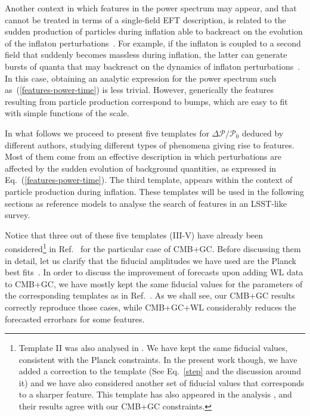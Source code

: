 \documentclass[12pt]{article}
\begin{document}
Another context in which features in the power spectrum may appear, and that cannot be treated in terms of a single-field EFT description, is related to the sudden production of particles during inflation able to backreact on the evolution of the inflaton perturbations~\cite{Chung:1999ve}. For example, if the inflaton is coupled to a second field that suddenly becomes massless during inflation, the latter can generate bursts of quanta that may backreact on the dynamics of inflaton perturbations~\cite{Barnaby:2009mc}. In this case, obtaining an analytic expression for the power spectrum such as~(\ref{features-power-time}) is less trivial. However, generically the features resulting from particle production correspond to bumps, which are easy to fit with simple functions of the scale.

In what follows we proceed to present five templates for $\Delta \mathcal P / \mathcal P_0$ deduced by different authors, studying different types of phenomena giving rise to features. Most of them come from an effective description in which perturbations are affected by the sudden evolution of background quantities, as expressed in Eq.~(\ref{features-power-time}). The third template, appears within the context of particle production during inflation. These templates will be used in the following sections as reference models to analyse the search of features in an LSST-like survey.

Notice that three out of these five templates (III-V) have already been considered\footnote{Template II was also analysed in \cite{Chen:2016vvw}. We have kept the same fiducial values, consistent with the Planck constraints. In the present work though, we have added a correction to the template (See Eq.~\eqref{step} and the discussion around it) and we have also considered another set of fiducial values that corresponds to a sharper feature. This template has also appeared in the analysis \cite{Ballardini:2017qwq}, and their results agree with our CMB+GC constraints.} in Ref.~\cite{Chen:2016vvw} for the particular case of CMB+GC. Before discussing them in detail, let us clarify that the fiducial amplitudes we have used are the Planck best fits~\cite{Ade:2015lrj}. %
In order to discuss the improvement of forecasts upon adding WL data to CMB+GC, we have mostly kept the same fiducial values for the parameters of the corresponding templates as in Ref.~\cite{Chen:2016vvw}. As we shall see, our CMB+GC results correctly reproduce those cases, while CMB+GC+WL considerably reduces the forecasted errorbars for some features. 
\end{document}
